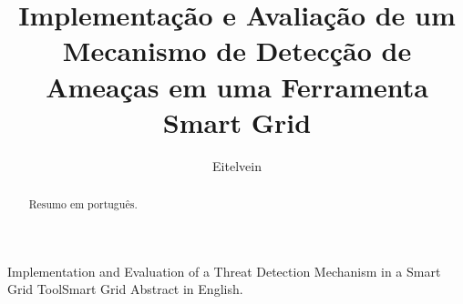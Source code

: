 \documentclass[cic,tc]{iiufrgs}
\title{Implementação e Avaliação de um Mecanismo de Detecção de Ameaças em uma Ferramenta Smart Grid}
\author{Eitelvein}{Luiza dos Santos}
\begin{document}
\maketitle





\begin{abstract}
    Resumo em português.
\end{abstract}

\begin{englishabstract}{Implementation and Evaluation of a Threat Detection Mechanism in a Smart Grid Tool}{Smart Grid}
    Abstract in English.
\end{englishabstract}

\listoffigures

\listoftables
\end{document}
